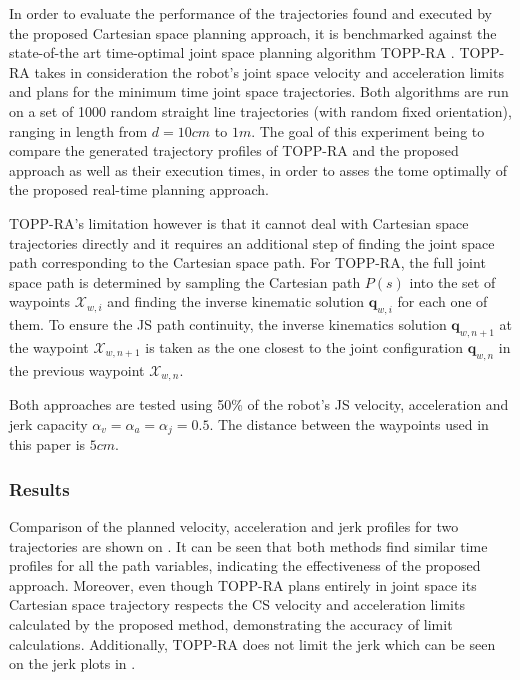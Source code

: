 In order to evaluate the performance of the trajectories found and executed by the proposed Cartesian space planning approach, it is benchmarked against the state-of-the art time-optimal joint space planning algorithm TOPP-RA \cite{Pham2018}. TOPP-RA takes in consideration the robot's joint space velocity and acceleration limits and plans for the minimum time joint space trajectories.
Both algorithms are run on a set of 1000 random straight line trajectories (with random fixed orientation), ranging in length from $d=10cm$ to $1m$. The goal of this experiment being to compare the generated trajectory profiles of TOPP-RA and the proposed approach as well as their execution times, in order to asses the tome optimally of the proposed real-time planning approach. 

TOPP-RA's limitation however is that it cannot deal with Cartesian space trajectories directly and it requires an additional step of finding the joint space path corresponding to the Cartesian space path.  For TOPP-RA, the full joint space path is determined by sampling the Cartesian path $P(s)$ into the set of waypoints $\mathcal{X}_{w,i}$ and finding the inverse kinematic solution $\bm{q}_{w,i}$ for each one of them. To ensure the JS path continuity, the inverse kinematics solution $\bm{q}_{w,n+1}$ at the waypoint $\mathcal{X}_{w,n+1}$ is taken as the one closest to the joint configuration $\bm{q}_{w,n}$ in the previous waypoint $\mathcal{X}_{w,n}$.

Both approaches are tested using 50\% of the robot's JS velocity, acceleration and jerk capacity $\alpha_v\!=\!\alpha_a\!=\!\alpha_j = 0.5$. The distance between the waypoints used in this paper is $5cm$. 



\subsubsection*{Results} Comparison of the planned velocity, acceleration and jerk profiles for two trajectories are shown on . It can be seen that both methods find similar time profiles for all the path variables, indicating the effectiveness of the proposed approach. Moreover, even though TOPP-RA plans entirely in joint space its Cartesian space trajectory respects the CS velocity and acceleration limits calculated by the proposed method, demonstrating the accuracy of limit calculations. Additionally, TOPP-RA does not limit the jerk which can be seen on the jerk plots in .

